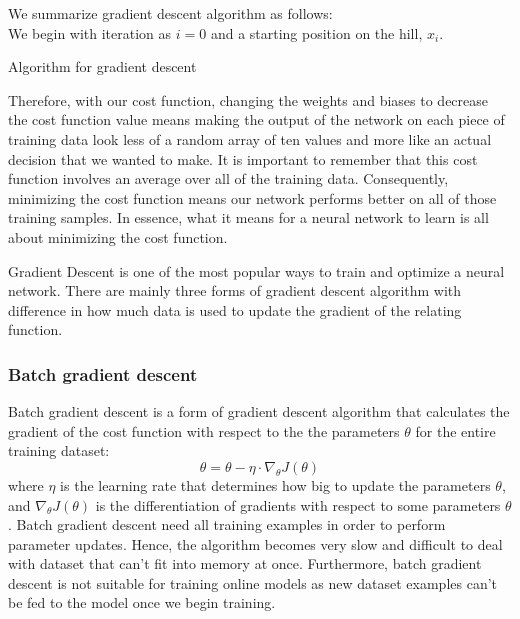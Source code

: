 \documentclass[master]{thesis-uestc}
\begin{document}
We summarize gradient descent algorithm as follows:\\
We begin with iteration as $i = 0$ and a starting position on the hill, $x_i$.
\begin{algorithm}[H]
\SetAlgoLined
{}
 \caption{Algorithm for gradient descent}
\end{algorithm}

Therefore, with our cost function, changing the weights and biases to decrease the cost function value means making the output of the network on each piece of training data look less of a random array of ten values and more like an actual decision that we wanted to make. It is important to remember that this cost function involves an average over all of the training data. Consequently, minimizing the cost function means our network performs better on all of those training samples. In essence, what it means for a neural network to learn is all about minimizing the cost function.

Gradient Descent is one of the most popular ways to train and optimize a neural network. There are mainly three forms of gradient descent algorithm with difference in how much data is used to update the gradient of the relating function.

\subsubsection{Batch gradient descent}
Batch gradient descent is a form of gradient descent algorithm that calculates the gradient of the cost function with respect to the the parameters $\theta$ for the entire training dataset:
\begin{equation}
    \theta = \theta - \eta \cdot \nabla_\theta J(\theta)
\end{equation}
where $\eta$ is the learning rate that determines how big to update the parameters $\theta$, and $\nabla_\theta J(\theta)$ is the differentiation of gradients with respect to some parameters $\theta$. Batch gradient descent need all training examples in order to perform parameter updates. Hence, the algorithm becomes very slow and difficult to deal with dataset that can't fit into memory at once. Furthermore, batch gradient descent is not suitable for training online models as new dataset examples can't be fed to the model once we begin training. 
\end{document}

